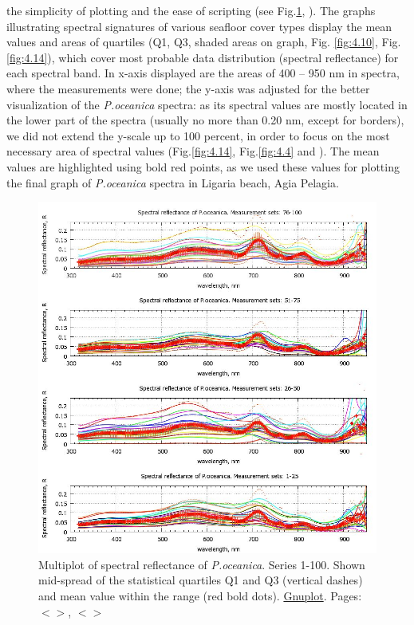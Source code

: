 \documentclass[11pt]{article}
\begin{document}
the simplicity of plotting and the ease of scripting (see Fig.\ref{fig:4.13}, ).
The graphs illustrating spectral signatures of various seafloor cover types display the mean values and
areas of quartiles (Q1, Q3, shaded areas on graph, Fig. \ref{fig:4.10}, Fig.\ref{fig:4.14}), which cover most probable data distribution (spectral reflectance) for each spectral band. In x-axis displayed are the areas of 400 – 950 nm in
spectra, where the measurements were done; the y-axis was adjusted for the better visualization of the
\textit{P.oceanica} spectra: as its spectral values are mostly located in the lower part of the spectra (usually no
more than 0.20 nm, except for borders), we did not extend the y-scale up to 100 percent, in order to
focus on the most necessary area of spectral values (Fig.\ref{fig:4.14}, Fig.\ref{fig:4.4} and ). The mean values are
highlighted using bold red points, as we used these values for plotting the final graph of \textit{P.oceanica} spectra in
Ligaria beach, Agia Pelagia.

\begin{figure}[H]
	\begin{center}
		\includegraphics[scale=0.50]{GNU-13.jpg}
		\caption{Multiplot of spectral reflectance of \textit{P.oceanica}. Series 1-100. Shown mid-spread of the statistical quartiles Q1 and Q3 (vertical dashes) and mean value within the range (red bold dots). \href{http://www.gnuplot.info/}{Gnuplot}­. Pages: $<$\pageref{page-21}$>$, $<$\pageref{page-41}$>$}
		\label{fig:4.13}
	\end{center}
\end{figure}
\end{document}
